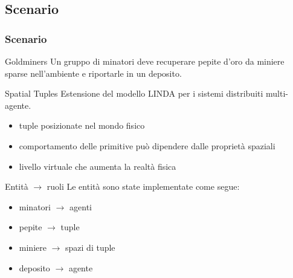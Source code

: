 \documentclass[handout]{beamer}\mode<presentation>{\usetheme{AMSCesenaBleu}}
\begin{document}
\subsection{Scenario}
\begin{frame}
\frametitle{Scenario}
\begin{block}{Goldminers}
Un gruppo di minatori deve recuperare pepite d'oro da miniere sparse nell'ambiente e riportarle in un deposito.
\end{block}

\begin{block}{Spatial Tuples}
Estensione del modello LINDA per i sistemi distribuiti multi-agente.
\begin{itemize}
\item tuple posizionate nel mondo fisico
\item comportamento delle primitive può dipendere dalle proprietà spaziali
\item livello virtuale che aumenta la realtà fisica
\end{itemize}
\end{block}

\begin{block}{Entità $\rightarrow$ ruoli}
Le entità sono state implementate come segue:
\begin{varwidth}[t]{.4\textwidth}
\begin{itemize}
\item \alert{minatori} $\rightarrow$ \alert{agenti}
\item pepite $\rightarrow$ tuple
\end{itemize}
\end{varwidth}
\hspace{2em}
\begin{varwidth}[t]{.4\textwidth}
\begin{itemize}
\item \alert{miniere} $\rightarrow$ \alert{spazi di tuple}
\item deposito $\rightarrow$ agente
\end{itemize}
\end{varwidth}
\end{block}
\end{frame}
\end{document}
